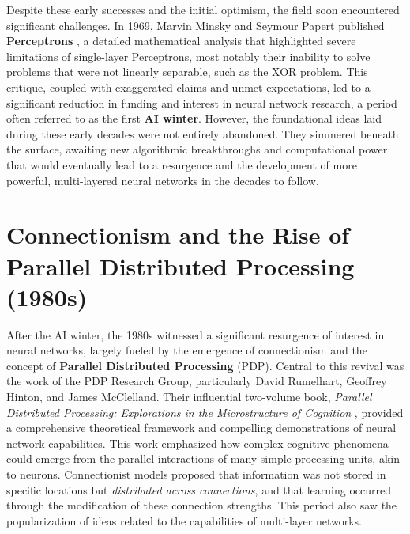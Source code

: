 Despite these early successes and the initial optimism, the field soon encountered significant challenges. In 1969, Marvin Minsky and Seymour Papert published \textbf{Perceptrons} \cite{minsky1969perceptrons}, a detailed mathematical analysis that highlighted severe limitations of single-layer Perceptrons, most notably their inability to solve problems that were not linearly separable, such as the XOR problem. This critique, coupled with exaggerated claims and unmet expectations, led to a significant reduction in funding and interest in neural network research, a period often referred to as the first \textbf{AI winter}. However, the foundational ideas laid during these early decades were not entirely abandoned. They simmered beneath the surface, awaiting new algorithmic breakthroughs and computational power that would eventually lead to a resurgence and the development of more powerful, multi-layered neural networks in the decades to follow.

\section{Connectionism and the Rise of Parallel Distributed Processing (1980s)}

After the AI winter, the 1980s witnessed a significant resurgence of interest in neural networks, largely fueled by the emergence of connectionism and the concept of \textbf{Parallel Distributed Processing} (PDP). Central to this revival was the work of the PDP Research Group, particularly David Rumelhart, Geoffrey Hinton, and James McClelland. Their influential two-volume book, \textit{Parallel Distributed Processing: Explorations in the Microstructure of Cognition} \cite{mcclelland1986parallel}, provided a comprehensive theoretical framework and compelling demonstrations of neural network capabilities. This work emphasized how complex cognitive phenomena could emerge from the parallel interactions of many simple processing units, akin to neurons. Connectionist models proposed that information was not stored in specific locations but \textit{distributed across connections}, and that learning occurred through the modification of these connection strengths. This period also saw the popularization of ideas related to the capabilities of multi-layer networks.

